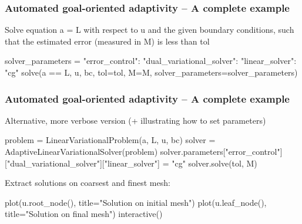 \begin{frame}[fragile]
  \frametitle{Automated goal-oriented adaptivity -- A complete example}
Solve equation a = L with respect to u and the given boundary
conditions, such that the estimated error (measured in M) is less
than tol
\vspace{-1.0em}
\begin{python}
solver_parameters = {"error_control":
                     {"dual_variational_solver":
                      {"linear_solver": "cg"}}}
solve(a == L, u, bc, tol=tol, M=M, solver_parameters=solver_parameters)
\end{python}
\end{frame}

\begin{frame}[shrink=5,fragile]
  \frametitle{Automated goal-oriented adaptivity -- A complete example}
Alternative, more verbose version (+ illustrating how to set parameters)
\vspace{-1.0em}
\begin{python}
problem = LinearVariationalProblem(a, L, u, bc)
solver = AdaptiveLinearVariationalSolver(problem)
solver.parameters["error_control"]["dual_variational_solver"]["linear_solver"] = "cg"
solver.solve(tol, M)
\end{python}
\bigskip
Extract solutions on coarsest and finest mesh:
\bigskip
\vspace{-1.5em}
\begin{python}
plot(u.root_node(), title="Solution on initial mesh")
plot(u.leaf_node(), title="Solution on final mesh")
interactive()
\end{python}
\end{frame}

